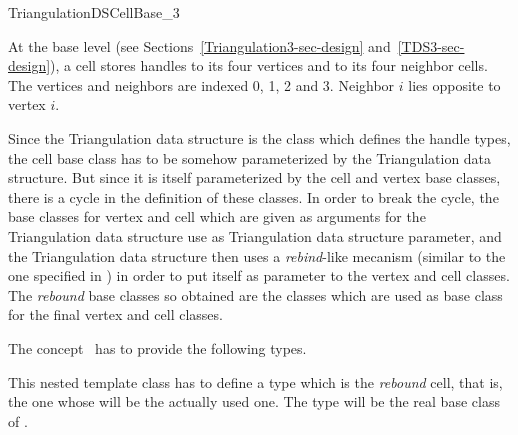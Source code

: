 

\begin{ccRefConcept}{TriangulationDSCellBase_3}


\ccDefinition
  
At the base level 
(see Sections~\ref{Triangulation3-sec-design} and~\ref{TDS3-sec-design}),
a cell stores handles to its four vertices and to its four neighbor cells. 
The vertices and neighbors are indexed 0, 1, 2 and 3. Neighbor $i$
lies opposite to vertex $i$.

Since the Triangulation data structure is the class which defines the handle
types, the cell base class has to be somehow parameterized by the Triangulation
data structure.  But since it is itself parameterized by the cell and vertex
base classes, there is a cycle in the definition of these classes.  In order
to break the cycle, the base classes for vertex and cell which are given as
arguments for the Triangulation data structure use  as Triangulation
data structure parameter, and the Triangulation data structure then uses a
{\it rebind}-like mecanism (similar to the one specified in
) in order to put itself as parameter to the vertex and
cell classes.  The {\it rebound} base classes so obtained are the classes
which are used as base class for the final vertex and cell classes.

\ccTypes
{}
\ccThreeToTwo
The concept \ccRefName\ has to provide the following types.

{This nested template class has to define a type  which is the
{\it rebound} cell, that is, the one whose 
will be the actually used one.  The  type will be the real base
class of .}


\end{ccRefConcept}
